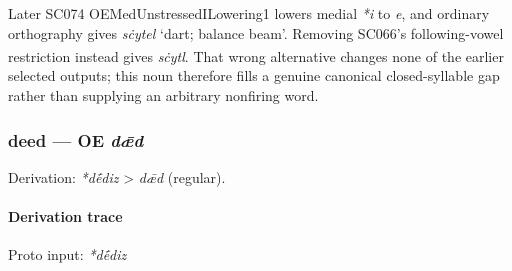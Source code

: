 \documentclass[
  british,
  a4paper,
]{article}
\newcounter{none} %
\providecommand{\Pred}[1]{\textsuperscript{\dag}\emph{#1}}
\begin{document}
Later SC074 OEMedUnstressedILowering1 lowers medial \emph{*i} to
\emph{e}, and ordinary orthography gives \emph{sċytel} `dart; balance
beam'. Removing SC066's following-vowel restriction instead gives
\Pred{sċytl}. That wrong alternative changes none of the earlier
selected outputs; this noun therefore fills a genuine canonical
closed-syllable gap rather than supplying an arbitrary nonfiring word.

\subsubsection{\texorpdfstring{deed --- OE
\emph{dǣd}}{deed --- OE dǣd}}\label{deed-oe-dux1e3d}

Derivation: \emph{*dḗdiz} \textgreater{} \emph{dǣd} (regular).

\paragraph{Derivation trace}\label{derivation-trace-17}

Proto input: \emph{*dḗdiz}

\begingroup
\setlength{\fboxsep}{6pt}
\end{document}
